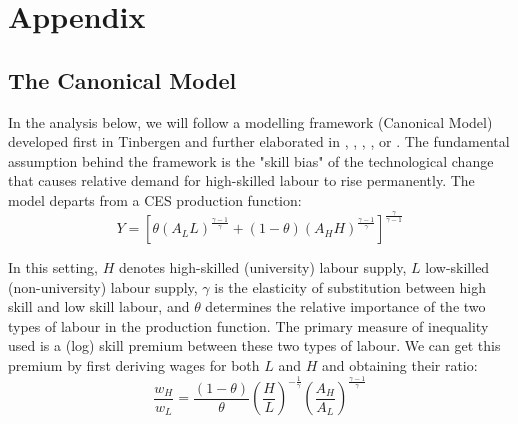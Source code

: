 \documentclass[11pt]{article}
\begin{document}



\newpage
\appendix
\section{Appendix}
\setcounter{table}{0}
\renewcommand{\thetable}{A\arabic{table}}
\renewcommand{\thefigure}{A\arabic{figure}}
\setcounter{figure}{0}

\subsection{The Canonical Model}\label{canonical}
In the analysis below, we will follow a modelling framework (Canonical Model) developed first in Tinbergen and further elaborated in \citet{katz1992changes}, \citet{goldin2010race}, \citet{card2001can}, \citet{acemoglu2011skills}, or \citet{glitz2021skill}.
The fundamental assumption behind the framework is the "skill bias" of the technological change that causes relative demand for high-skilled labour to rise permanently.
The model departs from a CES production function:
\begin{equation}
\label{eqn:STBC_prod_function}
Y = [\theta(A_{L}L)^{\frac{\gamma - 1}{\gamma}} + (1 - \theta)(A_{H}H)^{\frac{\gamma - 1}{\gamma}}]^\frac{\gamma}{\gamma - 1}
\end{equation}

In this setting, $H$ denotes high-skilled (university) labour supply, $L$ low-skilled (non-university) labour supply, $\gamma$ is the elasticity of substitution between high skill and low skill labour, and $\theta$ determines the relative importance of the two types of labour in the production function. The primary measure of inequality used is a (log) skill premium between these two types of labour. We can get this premium by first deriving wages for both $L$ and $H$ and obtaining their ratio:
\[\frac{w_{H}}{w_{L}} = \frac{(1 - \theta)}{\theta} \left(\frac{H}{L}\right)^{-\frac{1}{\gamma}}\left(\frac{A_{H}}{A_{L}}\right)^{\frac{\gamma - 1}{\gamma}}\]
\end{document}
